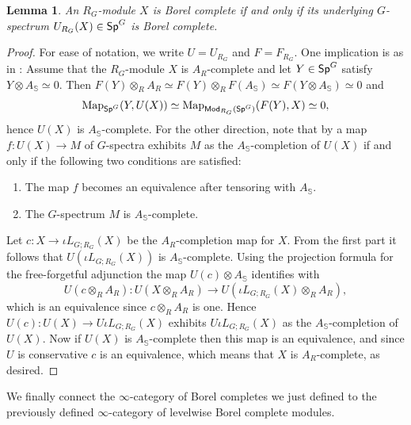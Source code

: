 \documentclass[reqno]{amsart}
\numberwithin{equation}{section}\theoremstyle{thms}
\newtheorem{lem}[equation]{Lemma}
\theoremstyle{defn}
\newcommand{\bS}{\mathbb{S}}
\newcommand{\tn}[1]{\textnormal{#1}}
\newcommand{\tsf}[1]{\textsf{\textup{#1}}}
\newcommand{\Map}{\tn{Map}}
\newcommand{\Mod}{\tsf{Mod}}
\newcommand{\specg}{\tsf{Sp}^G}
\begin{document}
\begin{lem}\label{lem:completionunderlyingprofinite}
An $R_G$-module $X$ is Borel complete if and only if its underlying $G$-spectrum $U_{R_G}(X) \in \specg$ is Borel complete.
\end{lem}
\begin{proof}
For ease of notation, we write $U=U_{R_G}$ and $F=F_{R_G}$. One implication is as in : Assume that the $R_G$-module $X$ is $A_R$-complete and let $Y \in \specg$ satisfy $Y \otimes A_{\bS} \simeq 0$. Then $F(Y) \otimes_R A_R \simeq F(Y) \otimes_R F(A_{\bS}) \simeq F(Y \otimes A_{\bS}) \simeq 0$ and
$$\Map_{\specg}(Y,U(X)) \simeq \Map_{\Mod_{R_G}(\specg)}(F(Y),X) \simeq 0,$$
hence $U(X)$ is $A_{\bS}$-complete. For the other direction, note that by \cite[§2.2]{mnn17} a map $f:U(X) \to M$ of $G$-spectra exhibits $M$ as the $A_{\bS}$-completion of $U(X)$ if and only if the following two conditions are satisfied:
\begin{enumerate}
    \item The map $f$ becomes an equivalence after tensoring with $A_{\bS}$.
    \item The $G$-spectrum $M$ is $A_{\bS}$-complete.
\end{enumerate}
Let $c: X \to \iota L_{G;R_G}(X)$ be the $A_R$-completion map for $X$. From the first part it follows that $U(\iota L_{G;R_G}(X))$ is $A_{\bS}$-complete. Using the projection formula for the free-forgetful adjunction the map $U(c) \otimes A_{\bS}$ identifies with
$$U(c \otimes_R A_R): U(X \otimes_R A_R) \to U(\iota L_{G;R_G}(X) \otimes_R A_R),$$
which is an equivalence since $c \otimes_R A_R$ is one. Hence $U(c): U(X) \to U\iota L_{G;R_G}(X)$ exhibits $U\iota L_{G;R_G}(X)$ as the $A_{\bS}$-completion of $U(X)$. Now if $U(X)$ is $A_{\bS}$-complete then this map is an equivalence, and since $U$ is conservative $c$ is an equivalence, which means that $X$ is $A_R$-complete, as desired.
\end{proof}

We finally connect the $\infty$-category of Borel completes we just defined to the previously defined $\infty$-category of levelwise Borel complete modules.
\end{document}
